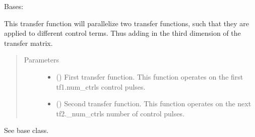 \documentclass[letterpaper,10pt,english]{sphinxmanual}
\begin{document}
\begin{fulllineitems}
\label{\detokenize{qsim:qsim.transfer_function.ParallelTF}}
Bases: {\hyperref[\detokenize{qsim:qsim.transfer_function.TransferFunction}]{}}

This transfer function will parallelize two transfer functions, such that
they are applied to different control terms. Thus adding in the third
dimension of the transfer matrix.
\begin{quote}\begin{description}
\item[{Parameters}] \leavevmode\begin{itemize}
\item {} 
 ({\hyperref[\detokenize{qsim:qsim.transfer_function.TransferFunction}]{}}) \textendash{} First transfer function. This function operates on the first
tf1.num\_ctrls control pulses.

\item {} 
 ({\hyperref[\detokenize{qsim:qsim.transfer_function.TransferFunction}]{}}) \textendash{} Second transfer function. This function operates on the
next tf2.\_num\_ctrls number of control pulses.

\end{itemize}

\end{description}\end{quote}

\begin{fulllineitems}
\label{\detokenize{qsim:qsim.transfer_function.ParallelTF.set_times}}
See base class.

\end{fulllineitems}


\end{fulllineitems}
\end{document}
